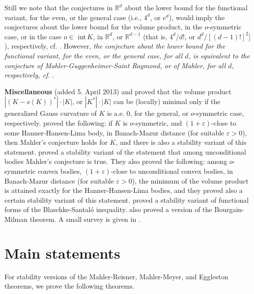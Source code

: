 \documentclass[12pt]{article}
\begin{document}
Still we note that the conjectures in ${\mathbb R}^d$ 
about the lower bound for the
functional variant, for the even, or the general case (i.e., $4^d$, or $e^d$), 
would imply the
conjectures about the lower bound for the volume product, in the
$o$-symmetric case, or in the case $o \in
$ int\,$K$, in ${\mathbb R}^d$, or ${\mathbb R}^{d-1}$
(that is, $4^d/d!$, or $d^d/[(d-1)!]^2]$), 
respectively, cf. \cite{FM08b}. 
However, {\it{the
conjecture about the lower bound for the
functional variant, for the even, or the general case,
for all $d$, is 
equivalent to the conjecture of Mahler-Guggenheimer-Saint Raymond, 
or of Mahler,
for all $d$, respectively, cf.}} \cite{FM08b}.

{\bf{Miscellaneous}} (added 5. April 2013)
\cite{Stancu} and 
\cite{RSchW} proved that the volume product $|\left( K-s(K) \right) ^*| \cdot
|K|$, or $|K^*| \cdot |K|$ can be (locally) 
minimal only if the generalized Gauss
curvature of $K$
is a.e. $0$, for the general, or $o$-symmetric case, respectively.
\cite{Kim} proved the following: if $K$ is $o$-symmetric, and $(1+\varepsilon
)$-close to some Hanner-Hansen-Lima body, in Banach-Mazur distance
(for suitable $\varepsilon >0$), then Mahler's conjecture holds for
$K$, and there is also a stability variant of this statement.
\cite{KimZva} proved a stability variant of the statement that among
unconditional bodies Mahler's conjecture is true. They also proved
the following: among $o$-symmetric convex bodies, $(1+
\varepsilon )$-close to unconditional convex bodies, in Banach-Mazur distance
(for suitable $\varepsilon >0$), the minimum of the volume
product is attained exactly for the Hanner-Hansen-Lima bodies, and they proved
also a certain
stability variant of this statement. \cite{BaBoFr} proved a stability
variant of functional forms of the Blaschke-Santal\'o inequality. \cite{GiPaVr}
also proved a version of the Bourgain-Milman theorem. A small survey is given
in \cite{Makai}.






\section{Main statements}

For stability versions of the Mahler-Reisner, Mahler-Meyer, and
Eggleston theorems, we prove the following theorems. 
\end{document}

